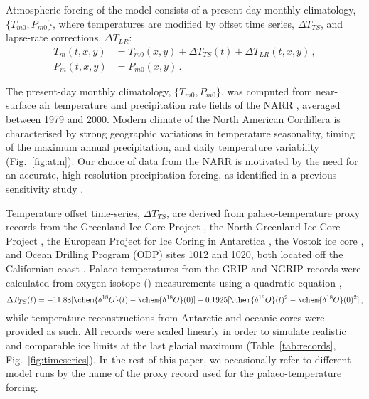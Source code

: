\documentclass[tc, manuscript]{copernicus}
\begin{document}
Atmospheric forcing of the model consists of a present-day monthly climatology,
$\{T_{m0}, P_{m0}\}$, where temperatures are modified by offset time series,
${\Delta}T_{TS}$, and lapse-rate corrections, ${\Delta}T_{LR}$:
\begin{align}
    T_m(t, x, y) &= T_{m0}(x, y) + {\Delta}T_{TS}(t)
                    + {\Delta}T_{LR}(t, x, y) \,, \\
    P_m(t, x, y) &= P_{m0}(x, y) \,.
\end{align}

The present-day monthly climatology, $\{T_{m0}, P_{m0}\}$, was computed from
near-surface air temperature and precipitation rate fields of the NARR
\citep{Mesinger.etal.2006}, averaged between 1979 and 2000. Modern climate of the
North American Cordillera is characterised by strong geographic variations in
temperature seasonality, timing of the maximum annual precipitation, and
daily temperature variability (Fig.~\ref{fig:atm}).
Our choice of data from the NARR is motivated by the need for an accurate,
high-resolution precipitation forcing, as identified in a previous sensitivity
study \citep{Seguinot.etal.2014}.

Temperature offset time-series, ${\Delta}T_{TS}$, are derived from
palaeo-temperature proxy records from
the Greenland Ice Core Project \citep[GRIP,][]{Dansgaard.etal.1993}, the
North Greenland Ice Core Project \citep[NGRIP,][]{Andersen.etal.2004},
the European Project for Ice Coring in Antarctica \citep[EPICA,][]
{Jouzel.etal.2007}, the Vostok ice core \citep{Petit.etal.1999}, and Ocean
Drilling Program (ODP) sites 1012 and 1020, both located off the Californian
coast \citep{Herbert.etal.2001}. Palaeo-temperatures from the GRIP and NGRIP
records were calculated from oxygen isotope () measurements
using a quadratic equation \citep{Johnsen.etal.1995},
\begin{equation}
    {\Delta}T_{TS}(t) = -11.88 [\chem{\delta^{18}O}(t)
                               -\chem{\delta^{18}O}(0)]
                        -0.1925[\chem{\delta^{18}O}(t)^2
                                -\chem{\delta^{18}O}(0)^2] \,,
\end{equation}
while temperature reconstructions from Antarctic and oceanic cores were
provided as such. All records were scaled linearly in
order to simulate realistic and comparable ice limits at the last
glacial maximum (Table~\ref{tab:records}, Fig.~\ref{fig:timeseries}).
In the rest of this paper, we occasionally refer to different model
runs by the name of the proxy record used for the palaeo-temperature forcing.
\end{document}
